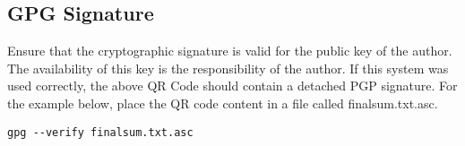 \documentclass[a4paper,12pt]{texMemo}
\begin{document}
\subsection{GPG Signature}
Ensure that the cryptographic signature is valid for the public key of the author. The availability of this key is the responsibility of the author. If this system was used correctly, the above QR Code should contain a detached PGP signature. For the example below, place the QR code content in a file called finalsum.txt.asc.
\begin{lstlisting}
gpg --verify finalsum.txt.asc
\end{lstlisting}
\end{document}
